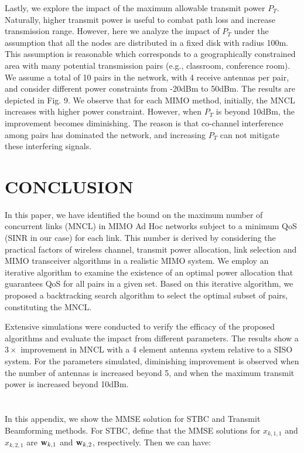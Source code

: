 \documentclass[draftcls,onecolumn,peerview,12pt]{IEEEtran}
\begin{document}
Lastly, we explore the impact of the maximum allowable transmit
power $P_T$. Naturally, higher transmit power is useful to combat
path loss and increase transmission range. However, here we analyze
the impact of $P_T$ under the assumption that all the nodes are
distributed in a fixed disk with radius 100m. This assumption is
reasonable which corresponds to a geographically constrained area
with many potential transmission pairs (e.g., classroom, conference
room). We assume a total of 10 pairs in the network, with 4 receive
antennas per pair, and consider different power constraints from
-20dBm to 50dBm. The results are depicted in Fig. 9. We observe that
for each MIMO method, initially, the MNCL increases with higher
power constraint. However, when $P_T$ is beyond 10dBm, the
improvement becomes diminishing. The reason is that co-channel
interference among pairs has dominated the network, and increasing
$P_T$ can not mitigate these interfering signals.



\section{CONCLUSION}
In this paper, we have identified the bound on the maximum number of
concurrent links (MNCL) in MIMO Ad Hoc networks subject to a minimum
QoS (SINR in our case) for each link. This number is derived by
considering the practical factors of wireless channel, transmit
power allocation, link selection and MIMO transceiver algorithms in
a realistic MIMO system. We employ an iterative algorithm to examine
the existence of an optimal power allocation that guarantees QoS for
all pairs in a given set. Based on this iterative algorithm, we
proposed a backtracking search algorithm to select the optimal
subset of pairs, constituting the MNCL.

Extensive simulations were conducted to verify the efficacy of the
proposed algorithms and evaluate the impact from different
parameters. The results show a $3\times$ improvement in MNCL with a
4 element antenna system relative to a SISO system. For the
parameters simulated, diminishing improvement is observed when the
number of antennas is increased beyond 5, and when the maximum
transmit power is increased beyond 10dBm.

\appendices
\section{}
In this appendix, we show the MMSE solution for STBC and Transmit
Beamforming methods. For STBC, define that the MMSE solutions for
$x_{k,1,1}$ and $x_{k,2,1}$ are ${\rm{\bf w}}_{k,1}$ and ${\rm{\bf
w}}_{k,2}$, respectively. Then we can have:
\end{document}

